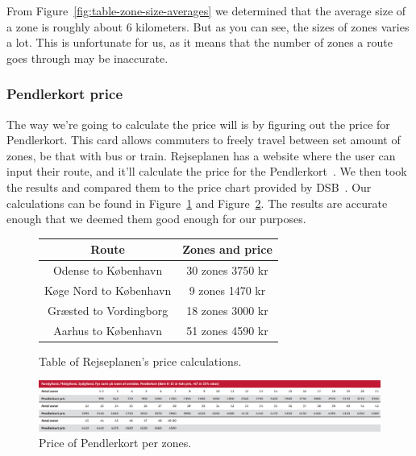 From Figure~\ref{fig:table-zone-size-averages} we determined that the average size of a zone is roughly about 6
kilometers.
But as you can see, the sizes of zones varies a lot.
This is unfortunate for us, as it means that the number of zones a route goes through may be inaccurate.

\subsubsection{Pendlerkort price}

The way we're going to calculate the price will is by figuring out the price for Pendlerkort.
This card allows commuters to freely travel between set amount of zones, be that with bus or train.
Rejseplanen has a website where the user can input their route, and it'll calculate the price for the
Pendlerkort~\cite{price_calculator}.
We then took the results and compared them to the price chart provided by DSB~\cite{price_sheet}.
Our calculations can be found in Figure~\ref{fig:table-rejseplanen-price-calculations} and
Figure~\ref{fig:image-dsb-pendlerkort-pris}.
The results are accurate enough that we deemed them good enough for our purposes.

\begin{figure}[H]
    \centering
    \noindent
    \begin{tabular}{ || c | c || }
        \hline
        Route & Zones and price \\
        \hline\hline
        Odense to København & 30 zones 3750 kr \\
        \hline
        Køge Nord to København & 9 zones 1470 kr \\
        \hline
        Græsted to Vordingborg & 18 zones 3000 kr \\
        \hline
        Aarhus to København & 51 zones 4590 kr \\
        \hline
    \end{tabular}
    \caption{Table of Rejseplanen's price calculations.}
    \label{fig:table-rejseplanen-price-calculations}
\end{figure}

\begin{figure}[H]
    \centering
    \includegraphics[width=1\textwidth]{images/dsb-pendlerkort-pris.jpg}
    \caption{Price of Pendlerkort per zones.}
    \label{fig:image-dsb-pendlerkort-pris}
\end{figure}

